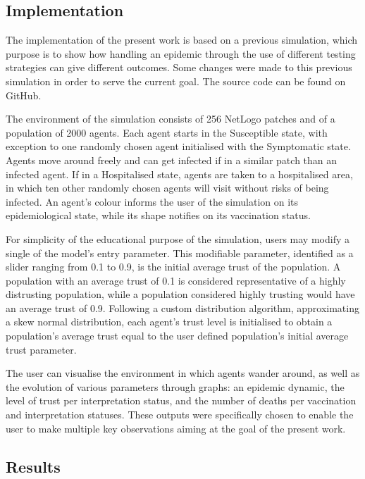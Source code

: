 \subsection{Implementation}

The implementation of the present work is based on a previous simulation, which purpose is to show how handling an epidemic through the use of different testing strategies can give different outcomes. Some changes were made to this previous simulation in order to serve the current goal. The source code can be found on GitHub.

The environment of the simulation consists of 256 NetLogo patches and of a population of 2000 agents. Each agent starts in the Susceptible state, with exception to one randomly chosen agent initialised with the Symptomatic state. Agents move around freely and can get infected if in a similar patch than an infected agent. If in a Hospitalised state, agents are taken to a hospitalised area, in which ten other randomly chosen agents will visit without risks of being infected. An agent’s colour informs the user of the simulation on its epidemiological state, while its shape notifies on its vaccination status.

For simplicity of the educational purpose of the simulation, users may modify a single of the model's entry parameter. This modifiable parameter, identified as a slider ranging from 0.1 to 0.9, is the initial average trust of the population. A population with an average trust of 0.1 is considered representative of a highly distrusting population, while a population considered highly trusting would have an average trust of 0.9. Following a custom distribution algorithm, approximating a skew normal distribution, each agent's trust level is initialised to obtain a population's average trust equal to the user defined population's initial average trust parameter.

The user can visualise the environment in which agents wander around, as well as the evolution of various parameters through graphs: an epidemic dynamic, the level of trust per interpretation status, and the number of deaths per vaccination and interpretation statuses. These outputs were specifically chosen to enable the user to make multiple key observations aiming at the goal of the present work.

\subsection{Results}

